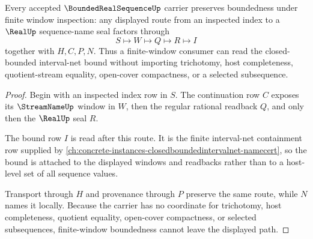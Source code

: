 \begin{theorem}
\label{thm:bounded-real-sequence-finite-window-bound}
Every accepted $\BoundedRealSequenceUp$ carrier preserves boundedness under finite window inspection: any displayed route from an inspected index to a $\RealUp$ sequence-name seal factors through
$$
S\longmapsto W\longmapsto Q\longmapsto R\longmapsto I
$$
together with $H,C,P,N$. Thus a finite-window consumer can read the closed-bounded interval-net bound without importing trichotomy, host completeness, quotient-stream equality, open-cover compactness, or a selected subsequence.
\end{theorem}
\begin{proof}
Begin with an inspected index row in $S$. The continuation row $C$ exposes its $\StreamNameUp$ window in $W$, then the regular rational readback $Q$, and only then the $\RealUp$ seal $R$.

The bound row $I$ is read after this route. It is the finite interval-net containment row supplied by \autoref{ch:concrete-instances-closedboundedintervalnet-namecert}, so the bound is attached to the displayed windows and readbacks rather than to a host-level set of all sequence values.

Transport through $H$ and provenance through $P$ preserve the same route, while $N$ names it locally. Because the carrier has no coordinate for trichotomy, host completeness, quotient equality, open-cover compactness, or selected subsequences, finite-window boundedness cannot leave the displayed path.
\end{proof}


